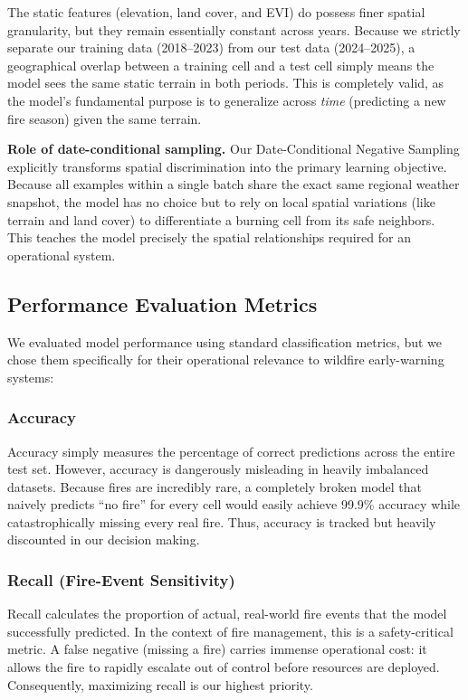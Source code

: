 The static features (elevation, land cover, and EVI) do possess finer spatial granularity, but they remain essentially constant across years. Because we strictly separate our training data (2018--2023) from our test data (2024--2025), a geographical overlap between a training cell and a test cell simply means the model sees the same static terrain in both periods. This is completely valid, as the model's fundamental purpose is to generalize across \textit{time} (predicting a new fire season) given the same terrain.

\medskip
\noindent\textbf{Role of date-conditional sampling.}
Our Date-Conditional Negative Sampling explicitly transforms spatial discrimination into the primary learning objective. Because all examples within a single batch share the exact same regional weather snapshot, the model has no choice but to rely on local spatial variations (like terrain and land cover) to differentiate a burning cell from its safe neighbors. This teaches the model precisely the spatial relationships required for an operational system.

\subsection{Performance Evaluation Metrics}

We evaluated model performance using standard classification metrics, but we chose them specifically for their operational relevance to wildfire early-warning systems:

\subsubsection{Accuracy}

Accuracy simply measures the percentage of correct predictions across the entire test set. However, accuracy is dangerously misleading in heavily imbalanced datasets. Because fires are incredibly rare, a completely broken model that naively predicts ``no fire'' for every cell would easily achieve 99.9\% accuracy while catastrophically missing every real fire. Thus, accuracy is tracked but heavily discounted in our decision making.

\subsubsection{Recall (Fire-Event Sensitivity)}

Recall calculates the proportion of actual, real-world fire events that the model successfully predicted. In the context of fire management, this is a safety-critical metric. A false negative (missing a fire) carries immense operational cost: it allows the fire to rapidly escalate out of control before resources are deployed. Consequently, maximizing recall is our highest priority.


